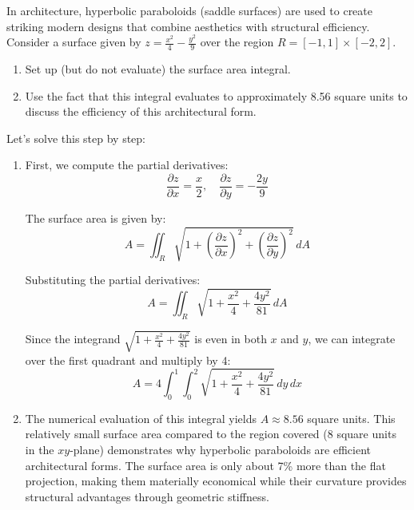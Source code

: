 \exampleline
\begin{example}
In architecture, hyperbolic paraboloids (saddle surfaces) are used to create striking modern designs that combine aesthetics with structural efficiency. Consider a surface given by $z = \frac{x^2}{4} - \frac{y^2}{9}$ over the region $R = [-1,1] \times [-2,2]$.

\begin{enumerate}
   \item Set up (but do not evaluate) the surface area integral.
   \item Use the fact that this integral evaluates to approximately 8.56 square units to discuss the efficiency of this architectural form.
\end{enumerate}

\begin{solution}
Let's solve this step by step:

\begin{enumerate}
   \item First, we compute the partial derivatives:
   \[
   \frac{\partial z}{\partial x} = \frac{x}{2}, \quad \frac{\partial z}{\partial y} = -\frac{2y}{9}
   \]

   The surface area is given by:
   \[
   A = \iint_R \sqrt{1 + \left(\frac{\partial z}{\partial x}\right)^2 + \left(\frac{\partial z}{\partial y}\right)^2}\,dA
   \]

   Substituting the partial derivatives:
   \[
   A = \iint_R \sqrt{1 + \frac{x^2}{4} + \frac{4y^2}{81}}\,dA
   \]

   Since the integrand $\sqrt{1 + \frac{x^2}{4} + \frac{4y^2}{81}}$ is even in both $x$ and $y$, we can integrate over the first quadrant and multiply by 4:
   \[
   A = 4\int_0^1\int_0^2 \sqrt{1 + \frac{x^2}{4} + \frac{4y^2}{81}}\,dy\,dx
   \]

   \item The numerical evaluation of this integral yields $A \approx 8.56$ square units. This relatively small surface area compared to the region covered ($8$ square units in the $xy$-plane) demonstrates why hyperbolic paraboloids are efficient architectural forms. The surface area is only about 7\% more than the flat projection, making them materially economical while their curvature provides structural advantages through geometric stiffness.
\end{enumerate}
\end{solution}
\end{example}
\exampleline


